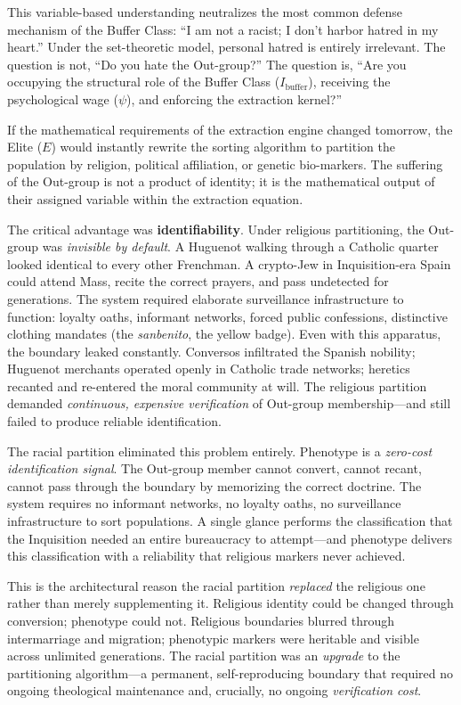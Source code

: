 \documentclass[12pt,openany]{book}
\begin{document}
This variable-based understanding neutralizes the most common defense mechanism of the Buffer Class: ``I am not a racist; I don't harbor hatred in my heart.'' Under the set-theoretic model, personal hatred is entirely irrelevant. The question is not, ``Do you hate the Out-group?'' The question is, ``Are you occupying the structural role of the Buffer Class ($I_{\text{buffer}}$), receiving the psychological wage ($\psi$), and enforcing the extraction kernel?'' 

If the mathematical requirements of the extraction engine changed tomorrow, the Elite ($E$) would instantly rewrite the sorting algorithm to partition the population by religion, political affiliation, or genetic bio-markers. The suffering of the Out-group is not a product of identity; it is the mathematical output of their assigned variable within the extraction equation.

The critical advantage was \textbf{identifiability}. Under religious partitioning, the Out-group was \textit{invisible by default}.
 A Huguenot walking through a Catholic quarter looked identical to every other Frenchman. A crypto-Jew in Inquisition-era Spain could attend Mass, recite the correct prayers, and pass undetected for generations. The system required elaborate surveillance infrastructure to function: loyalty oaths, informant networks, forced public confessions, distinctive clothing mandates (the \textit{sanbenito}, the yellow badge). Even with this apparatus, the boundary leaked constantly. Conversos infiltrated the Spanish nobility; Huguenot merchants operated openly in Catholic trade networks; heretics recanted and re-entered the moral community at will. The religious partition demanded \textit{continuous, expensive verification} of Out-group membership---and still failed to produce reliable identification.

The racial partition eliminated this problem entirely. Phenotype is a \textit{zero-cost identification signal}. The Out-group member cannot convert, cannot recant, cannot pass through the boundary by memorizing the correct doctrine. The system requires no informant networks, no loyalty oaths, no surveillance infrastructure to sort populations. A single glance performs the classification that the Inquisition needed an entire bureaucracy to attempt---and phenotype delivers this classification with a reliability that religious markers never achieved.

This is the architectural reason the racial partition \textit{replaced} the religious one rather than merely supplementing it. Religious identity could be changed through conversion; phenotype could not. Religious boundaries blurred through intermarriage and migration; phenotypic markers were heritable and visible across unlimited generations. The racial partition was an \textit{upgrade} to the partitioning algorithm---a permanent, self-reproducing boundary that required no ongoing theological maintenance and, crucially, no ongoing \textit{verification cost}.
\end{document}
